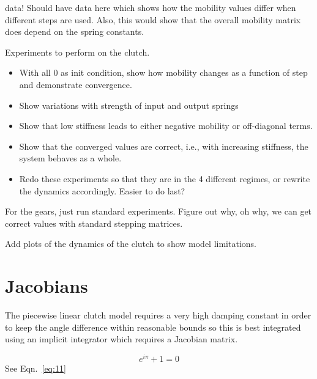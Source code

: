 \documentclass[10pt,notitlepage,abstracton]{scrartcl}
\theoremstyle{plain}
\theoremstyle{plain}
\theoremstyle{plain}
\begin{document}
\begin{anfxnote}{data!}
  Should have data here which shows how the mobility values differ when
  different steps are used.  Also, this would show that the overall
  mobility matrix does depend on the spring constants.  


  Experiments to perform on the clutch. 
  \begin{itemize}
  \item  With all $0$ as init condition, show how mobility changes as a
    function of step and demonstrate convergence. 
  \item Show variations with strength of input and output springs 
  \item Show that low stiffness leads to either negative mobility or
    off-diagonal terms. 
  \item Show that the converged values are correct, i.e., with increasing
    stiffness, the system behaves as a whole. 
  \item Redo these experiments so that they are in the 4 different regimes,
    or rewrite the dynamics accordingly.  Easier to do last? 
  \end{itemize}


  For the gears, just run standard experiments.  Figure out why, oh why, we
  can get correct values with standard stepping matrices. 

  Add plots of the dynamics of the clutch to show model limitations. 

\end{anfxnote}

\section{Jacobians}
\label{sec:jacobians}

The piecewise linear clutch model requires a very high damping constant in
order to keep the angle difference within reasonable bounds so this is best
integrated using an implicit integrator which requires a Jacobian matrix. 


\begin{equation}
  \label{eq:11}
  e^{{i\pi}} + 1 = 0
\end{equation}
See Eqn.~\eqref{eq:11}
 


  

\end{document}
